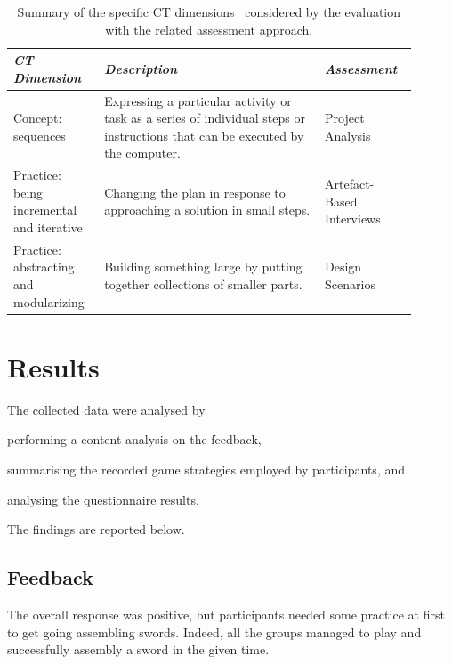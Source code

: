 \begin{table}[ht!]
  \caption{Summary of the specific \ac{CT} dimensions~\cite{Brennan:2012} considered by the evaluation with the related assessment approach.}\label{tab:ch5summary}
  \centering
  \begin{tabular}{M{0.2\linewidth}m{0.5\linewidth}M{0.2\linewidth}}
    \toprule
    \textit{\ac{CT} Dimension} & \textit{Description} & \textit{Assessment} \\
    \midrule
    Concept: sequences & Ex\-press\-ing a par\-tic\-u\-lar ac\-tiv\-i\-ty or task as a se\-ries of in\-di\-vid\-u\-al steps or in\-struc\-tions that can be ex\-e\-cut\-ed by the com\-put\-er. & Project Analysis \\
    Practice: being incremental and iterative & Changing the plan in response to approaching a solution in small steps. & Artefact-Based Interviews \\
    Practice: abstracting and modularizing & Building something large by putting together collections of smaller parts. & Design Scenarios \\
    \bottomrule
  \end{tabular}
\end{table}


\section{Results}
The collected data were analysed by
\begin{enumerate*}[label=(\arabic*)]
  \item performing a content analysis on the feedback,
  \item summarising the recorded game strategies employed by participants, and
  \item analysing the questionnaire results.
\end{enumerate*}
The findings are reported below.

\subsection{Feedback}
The overall response was positive, but participants needed some practice at first to get going assembling swords. Indeed, all the groups managed to play and successfully assembly a sword in the given time.

